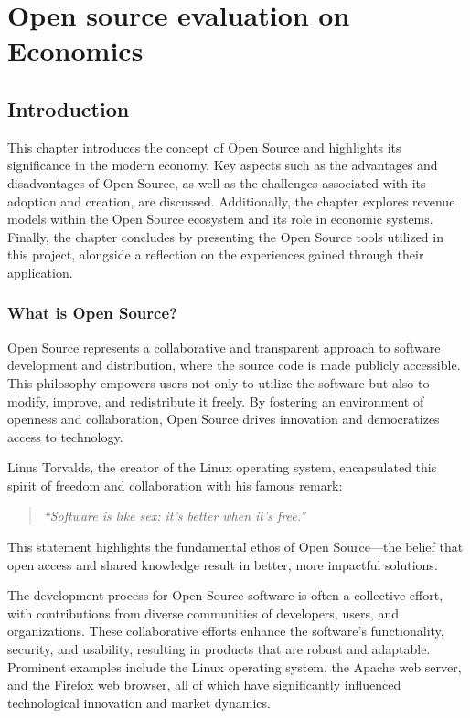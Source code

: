 \chapter{Open source evaluation on Economics}
\label{cha:Open_source_evaluation_Economics}

\section{Introduction}

This chapter introduces the concept of Open Source and highlights its significance in the modern economy. 
Key aspects such as the advantages and disadvantages of Open Source, as well as the challenges associated with its adoption and creation, are discussed. 
Additionally, the chapter explores revenue models within the Open Source ecosystem and its role in economic systems. 
Finally, the chapter concludes by presenting the Open Source tools utilized in this project, alongside a reflection on the experiences gained through their application.


\subsection{What is Open Source?}

Open Source represents a collaborative and transparent approach to software development and distribution, 
where the source code is made publicly accessible. This philosophy empowers users not only to utilize the software but also to modify, 
improve, and redistribute it freely. By fostering an environment of openness and collaboration, 
Open Source drives innovation and democratizes access to technology.

Linus Torvalds, the creator of the Linux operating system, encapsulated this spirit of freedom and collaboration with his famous remark:

\begin{quote}
    \textit{“Software is like sex: it's better when it's free.”}
    \author{Linus Torvalds}
\end{quote}

\cite{Linus_Torvalds_quote_open_source}

This statement highlights the fundamental ethos of Open Source—the belief that open access and shared knowledge result in better, more impactful solutions.


The development process for Open Source software is often a collective effort, 
with contributions from diverse communities of developers, users, and organizations. 
These collaborative efforts enhance the software's functionality, security, and usability, 
resulting in products that are robust and adaptable. Prominent examples include the Linux operating system, 
the Apache web server, and the Firefox web browser, all of which have significantly influenced technological innovation and market dynamics.

